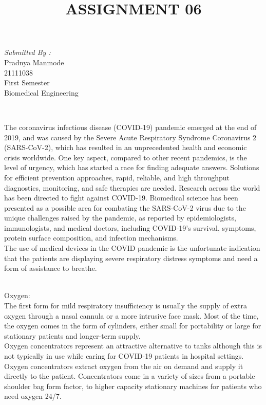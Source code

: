 \documentclass[12pt]{article}
\begin{document}
\begin{titlepage}
\begin{minipage}{0.4\textwidth}
			\begin{flushright} \large
			\emph{Submitted By :} \\
			Pradnya Manmode\\
            21111038\\
        First Semester\\
        Biomedical Engineering\\
		\end{flushright}
        
	\end{minipage}\\[2 cm]
	
	
    
    
    
    
	
\end{titlepage}


\title{ASSIGNMENT 06}
\maketitle

\indent
The coronavirus infectious disease (COVID-19) pandemic emerged at the end of 2019, and was caused by the Severe Acute Respiratory Syndrome Coronavirus 2 (SARS-CoV-2), which has resulted in an unprecedented health and economic crisis worldwide. One key aspect, compared to other recent pandemics, is the level of urgency, which has started a race for finding adequate answers. Solutions for efficient prevention approaches, rapid, reliable, and high throughput diagnostics, monitoring, and safe therapies are needed. Research across the world has been directed to fight against COVID-19. Biomedical science has been presented as a possible area for combating the SARS-CoV-2 virus due to the unique challenges raised by the pandemic, as reported by epidemiologists, immunologists, and medical doctors, including COVID-19’s survival, symptoms, protein surface composition, and infection mechanisms.
\\
The use of medical devices in the COVID pandemic is the unfortunate indication that the patients are displaying severe respiratory distress symptoms and need a form of assistance to breathe.

\\
{\large Oxygen:}
\\
The first form for mild respiratory insufficiency is usually the supply of extra oxygen through a nasal cannula or a more intrusive face mask. Most of the time, the oxygen comes in the form of cylinders, either small for portability or large for stationary patients and longer-term supply.\\
Oxygen concentrators represent an attractive alternative to tanks although this is not typically in use while caring for COVID-19 patients in hospital settings. Oxygen concentrators extract oxygen from the air on demand and supply it directly to the patient. Concentrators come in a variety of sizes from a portable shoulder bag form factor, to higher capacity stationary machines for patients who need oxygen 24/7.
\end{document}
